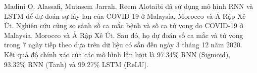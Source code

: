 Madini O. Alassafi, Mutasem Jarrah, Reem Alotaibi\cite{10263962} đã sử dụng mô hình RNN và LSTM  để dự đoán sự lây lan của COVID-19 ở Malaysia, Morocco và Ả Rập Xê Út. Nghiên cứu cũng so sánh số ca mắc bệnh và số ca tử vong do COVID-19 ở Malaysia, Morocco và Ả Rập Xê Út. Sau đó, họ dự đoán số ca mắc và tử vong trong 7 ngày tiếp theo dựa trên dữ liệu có sẵn đến ngày 3 tháng 12 năm 2020. Kết quả độ chính xác của các mô hình lần lượt là 97.34\% RNN (Sigmoid), 93.32\% RNN (Tanh) và 99.27\% LSTM (ReLU). 